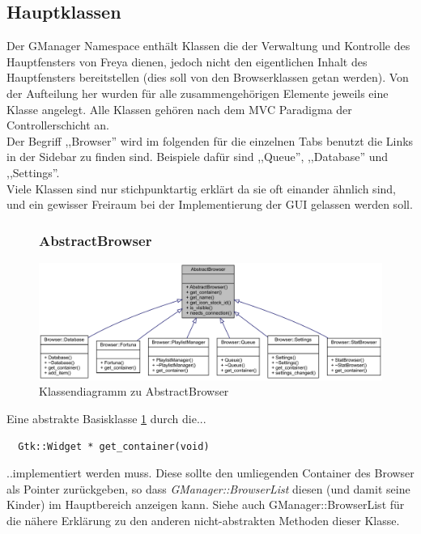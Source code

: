 \newpage

\subsection{Hauptklassen}
Der GManager Namespace enthält Klassen die der Verwaltung und Kontrolle des Hauptfensters von Freya dienen,
jedoch nicht den eigentlichen Inhalt des Hauptfensters bereitstellen (dies soll von den Browserklassen getan werden).
Von der Aufteilung her wurden für alle zusammengehörigen Elemente jeweils eine Klasse angelegt.
Alle Klassen gehören nach dem MVC Paradigma der Controllerschicht an.
\\
Der Begriff ,,Browser'' wird im folgenden für die einzelnen Tabs benutzt die Links in der Sidebar zu finden sind. 
Beispiele dafür sind ,,Queue'', ,,Database'' und ,,Settings''.
\\
Viele Klassen sind nur stichpunktartig erklärt da sie oft einander ähnlich sind, und ein gewisser Freiraum bei der Implementierung der
GUI gelassen werden soll.

\begin{figure}[htb!]
\subsubsection{AbstractBrowser}
	\centering
        \includegraphics[width=\textwidth]{./gfx/class/abstractbrowser}
	\caption{Klassendiagramm zu AbstractBrowser}
	\label{g_abstract_browser}
\end{figure}


Eine abstrakte Basisklasse \ref{g_abstract_browser} durch die...
\begin{verbatim}
  Gtk::Widget * get_container(void) 
\end{verbatim}
..implementiert werden muss. Diese sollte den umliegenden Container des Browser als Pointer zurückgeben,
so dass \textit{GManager::BrowserList} diesen (und damit seine Kinder) im Hauptbereich anzeigen kann.
Siehe auch GManager::BrowserList für die nähere Erklärung zu den anderen nicht-abstrakten Methoden dieser Klasse.

